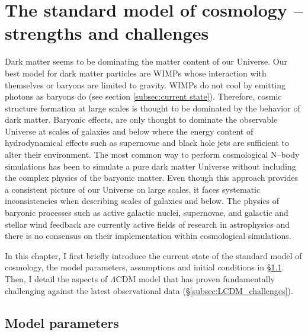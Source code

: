 \documentclass[a4wide,12pt]{book}
\begin{document}
\chapter{The standard model of cosmology -- strengths and challenges}
\label{sec:LCDM}
Dark matter seems to be dominating the matter content of our Universe. Our best model for dark matter particles are WIMPs whose interaction with themselves or baryons are limited to gravity.  WIMPs do not cool by emitting photons as baryons do (see section \ref{subsec:current state}). Therefore, cosmic structure formation at large scales is thought to be dominated by the behavior of dark matter. Baryonic effects, are only thought to dominate the observable Universe at scales of galaxies and below where the energy content of hydrodynamical effects such as supernovae and black hole jets are sufficient to alter their environment. The most common way to perform cosmological N--body simulations has been to simulate a pure dark matter Universe without including the complex physics of the baryonic matter.  Even though this approach provides a consistent picture of our Universe on large scales, it faces systematic inconsistencies when describing scales of galaxies and below. The physics of baryonic processes such as active galactic nuclei, supernovae, and galactic and stellar wind feedback are currently active fields of research in astrophysics and there is no consensus on their implementation within cosmological simulations. 


In this chapter, I first briefly introduce the current state of the standard model of cosmology, the model parameters, assumptions and initial conditions in  \S \ref{subsec:Model_parameters}. Then, I detail the aspects of $\Lambda$CDM model that has proven fundamentally challenging against the latest observational data (\S \ref{subsec:LCDM_challenges}).

\section{Model parameters}
\label{subsec:Model_parameters}
\end{document}
